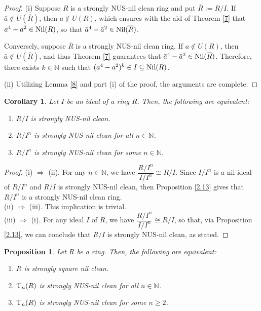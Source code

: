 \documentclass[12pt]{amsart}
\newtheorem{proposition}[theorem]{Proposition}
\newtheorem{corollary}[theorem]{Corollary}
\theoremstyle{definition}
\begin{document}
\begin{proof}
(i) Suppose $R$ is a strongly NUS-nil clean ring and put $\overline{R} := R/I$. If $\bar{a} \notin U(\overline{R})$, then $a \notin U(R)$, which ensures with the aid of Theorem \ref{7} that $a^4 - a^2 \in {\rm Nil}(R)$, so that $\bar{a}^4- \bar{a}^2 \in {\rm Nil}(\overline{R})$.

Conversely, suppose $\overline{R}$ is a strongly NUS-nil clean ring. If $a \notin U(R)$, then $\bar{a} \notin U(\overline{R})$, and thus Theorem \ref{7} guarantees that $\bar{a}^4- \bar{a}^2 \in {\rm Nil}(\overline{R})$. Therefore, there exists $k \in \mathbb{N}$ such that $(a^4- a^2)^k \in I \subseteq {\rm Nil}(R)$.

(ii) Utilizing Lemma \ref{8} and part (i) of the proof, the arguments are complete.
\end{proof}

\begin{corollary}\label{10}
Let $I$ be an ideal of a ring $R$. Then, the following are equivalent:
\begin{enumerate}
\item
$R/I$ is strongly NUS-nil clean.
\item
$R/I^n$	is strongly NUS-nil clean for all $n \in \mathbb{N}$.
\item
$R/I^n$ is strongly NUS-nil clean for some $n \in \mathbb{N}$.
\end{enumerate}	
\end{corollary}

\begin{proof}
(i) $\Longrightarrow$ (ii). For any $n \in \mathbb{N}$, we have $\dfrac{R/I^n}{I/I^n} \cong R/I$. Since $I/I^n$ is a nil-ideal of $R/I^n$ and $R/I$ is strongly NUS-nil clean, then Proposition \ref {2.13} gives that $R/I^n$ is a strongly NUS-nil clean ring.\\
(ii) $\Longrightarrow$ (iii). This implication is trivial.\\
(iii) $\Longrightarrow$ (i). For any ideal $I$ of $R$, we have $\dfrac{R/I^n}{I/I^n} \cong R/I$, so that, via Proposition \ref{2.13}, we can conclude that $R/I$ is strongly NUS-nil clean, as stated.
\end{proof}

\begin{proposition}\label{2.9}
Let $R$ be a ring. Then, the following are equivalent:
\begin{enumerate}
\item
$R$ is strongly square nil clean.
\item
${\rm T}_{n}(R)$ is strongly NUS-nil clean for all $n \in \mathbb{N}$.
\item
${\rm T}_n(R)$ is strongly NUS-nil clean for some $n \geq 2$.
\end{enumerate}
\end{proposition}
\end{document}
